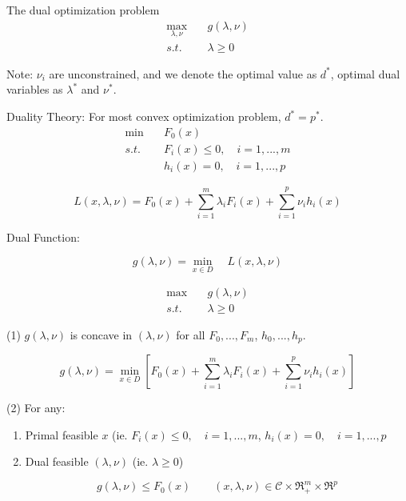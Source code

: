 \begin{definition}{The dual optimization problem}
	\begin{align*}
	\max_{\lambda, \nu} \quad&g(\lambda, \nu) \\
	s.t. \quad&\lambda \geq 0
	\end{align*}

Note: $\nu_i$ are unconstrained, and we denote the optimal value as $d^*$, optimal dual variables as $\lambda^*$ and $\nu^*$.
\end{definition}



Duality Theory: For most convex optimization problem, $d^* = p^*$.\\


\begin{align*}
\min \quad&F_0(x) \\
s.t. \quad&F_i(x)\leq 0, \quad i = 1,...,m \\
&h_i(x)= 0, \quad i = 1,...,p
\end{align*}

\begin{equation*}
L(x,\lambda,\nu) = F_0(x) + \sum^m_{i=1}\lambda_i F_i(x) + \sum^p_{i=1}\nu_i h_i(x)
\end{equation*}

Dual Function:

\begin{equation*}
g(\lambda, \nu) = \min_{x\in D}\quad L(x,\lambda,\nu) 
\end{equation*}


\begin{align*}
\max \quad&g(\lambda, \nu) \\
s.t. \quad&\lambda \geq 0
\end{align*}

(1) $g(\lambda, \nu)$ is concave in $(\lambda, \nu)$ for all $F_0,...,F_m$, $h_0,...,h_p$.

\begin{equation*}
g(\lambda, \nu) =\min_{x\in D}[F_0(x) + \sum^m_{i=1}\lambda_iF_i(x) + \sum^p_{i=1}\nu_ih_i(x) ]
\end{equation*}


(2) For any:

\begin{enumerate}
	\item Primal feasible $x$ (ie. $F_i(x)\leq 0, \quad i = 1,...,m$, $h_i(x)= 0, \quad i = 1,...,p$
	
	\item Dual feasible $(\lambda, \nu)$ (ie. $\lambda \geq 0$)
	
	\begin{equation*}
	g(\lambda, \nu)\leq F_0(x) \qquad (x, \lambda, \nu) \in \mathcal{C}\times \Re^m_+\times \Re^p
	\end{equation*}
\end{enumerate}

